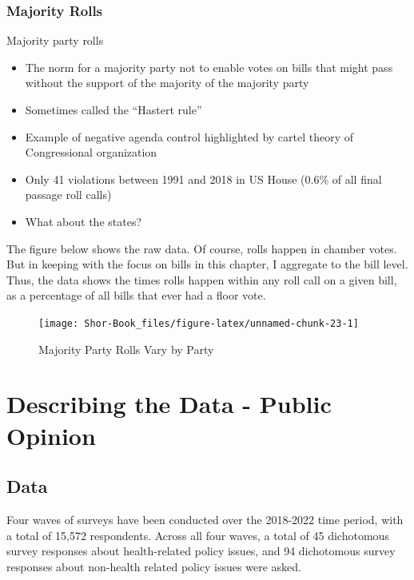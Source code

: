 \documentclass[
  oneside]{book}
\providecommand{\tightlist}{%
  \setlength{\itemsep}{0pt}\setlength{\parskip}{0pt}}
\begin{document}
\hypertarget{majority-rolls}{%
\subsection{Majority Rolls}\label{majority-rolls}}

Majority party rolls

\begin{itemize}
\tightlist
\item
  The norm for a majority party not to enable votes on bills that might pass without the support of the majority of the majority party
\item
  Sometimes called the ``Hastert rule''
\item
  Example of negative agenda control highlighted by cartel theory of Congressional organization
\item
  Only 41 violations between 1991 and 2018 in US House (0.6\% of all final passage roll calls)
\item
  What about the states? \citep{Anzia:2013}
\end{itemize}

The figure below shows the raw data. Of course, rolls happen in chamber votes. But in keeping with the focus on bills in this chapter, I aggregate to the bill level. Thus, the data shows the times rolls happen within any roll call on a given bill, as a percentage of all bills that ever had a floor vote.

\begin{figure}
\texttt{[image: Shor-Book\_files/figure-latex/unnamed-chunk-23-1]} \caption{Majority Party Rolls Vary by Party}\label{fig:unnamed-chunk-23}
\end{figure}

\hypertarget{describing-the-data---public-opinion}{%
\chapter{Describing the Data - Public Opinion}\label{describing-the-data---public-opinion}}

\hypertarget{data}{%
\section{Data}\label{data}}

Four waves of surveys have been conducted over the 2018-2022 time period, with a total of 15,572 respondents. Across all four waves, a total of 45 dichotomous survey responses about health-related policy issues, and 94 dichotomous survey responses about non-health related policy issues were asked.
\end{document}
